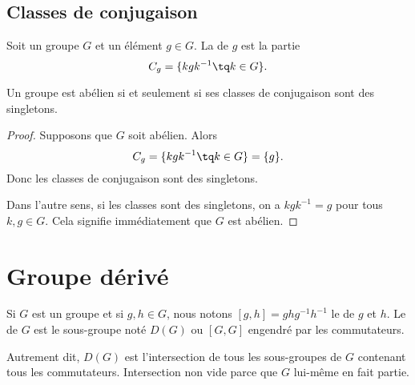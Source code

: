 \subsection{Classes de conjugaison}

\begin{definition}
    Soit un groupe \( G\) et un élément \( g\in G\). La  de \( g\) est la partie
    \begin{equation}
        C_g=\{ kgk^{-1}\tq k\in G \}.
    \end{equation}
\end{definition}

\begin{lemma}       \label{LEMooQYBJooYwMwGM}
    Un groupe est abélien si et seulement si ses classes de conjugaison sont des singletons.
\end{lemma}

\begin{proof}
    Supposons que \( G\) soit abélien. Alors
    \begin{equation}
        C_g=\{ kgk^{-1}\tq k\in G \}=\{ g \}.
    \end{equation}
    Donc les classes de conjugaison sont des singletons.

    Dans l'autre sens, si les classes sont des singletons, on a \( kgk^{-1}=g\) pour tous \( k,g\in G\). Cela signifie immédiatement que \( G\) est abélien.
\end{proof}

\section{Groupe dérivé}

\begin{definition}\label{DefVUFBooNQjEdn}
    Si \( G\) est un groupe et si \( g,h\in G\), nous notons \( [g,h]=ghg^{-1}h^{-1}\) le  de \( g\) et \( h\). Le  de \( G\) est le sous-groupe noté \( D(G)\) ou \( [G,G]\) engendré par les commutateurs.
\end{definition}
Autrement dit, \( D(G)\) est l'intersection de tous les sous-groupes de \( G\) contenant tous les commutateurs. Intersection non vide parce que \( G\) lui-même en fait partie.

